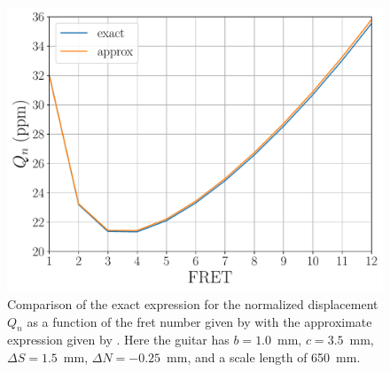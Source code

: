 
 \begin{figure}
  \centering
  \includegraphics[width=6.0in]{figures/qn_test}
  \caption{\label{fig:qn_test} Comparison of the exact expression for the normalized displacement $Q_n$ as a function of the fret number given by  with the approximate expression given by . Here the guitar has $b = 1.0$~mm, $c = 3.5$~mm, $\Delta S = 1.5$~mm, $\Delta N = -0.25$~mm, and a scale length of 650~mm.}
 \end{figure}



